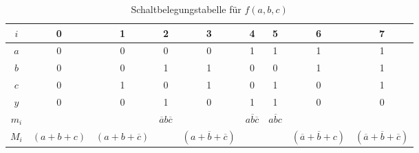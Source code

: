 \begin{table}
\caption{Schaltbelegungstabelle für $f(a, b, c)$}
\label{SBT_bsp}
\resizebox{1\textwidth}{!} {
\begin{tabular}{c*{8}{c}}
$i$              &        0      &             1            &              2              &                  3                  &                 4           &        5         &                 6                   &                       7                        \\ \hline
$a$              &        0      &             0            &              0              &                  0                  &                 1           &        1         &                 1                   &                       1                        \\ 
$b$              &        0      &             0            &              1              &                  1                  &                 0           &        0         &                 1                   &                       1                        \\
$c$              &        0      &             1            &              0              &                  1                  &                 0           &        1         &                 0                   &                       1                        \\ \hline
$y$              &        0      &             0            &              1              &                  0                  &                 1           &        1         &                 0                   &                       0                        \\
\hline\noalign{\smallskip}                                                                                                                                                                                                                                                              
$m_i$            &               &                          & $\overline{a}b\overline{c}$ &                                     & $a\overline{b}\overline{c}$ & $a\overline{b}c$ &                                     &                                                \\
\hline\noalign{\smallskip}
$M_i$            & $(a + b + c)$ & $(a + b + \overline{c})$ &                             & $(a + \overline{b} + \overline{c})$ &                             &                  & $(\overline{a} + \overline{b} + c)$ & $(\overline{a} + \overline{b} + \overline{c})$ \\
\end{tabular}
}
\end{table}

